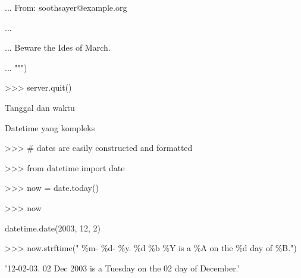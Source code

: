\noindent 
{\fontsize{14pt}{14pt}\selectfont ... From: soothsayer@example.org \\} \par
\noindent 
{\fontsize{14pt}{14pt}\selectfont ... \\} \par
\noindent 
{\fontsize{14pt}{14pt}\selectfont ... Beware the Ides of March. \\} \par
\noindent 
{\fontsize{14pt}{14pt}\selectfont ... """) \\} \par
\noindent 
{\fontsize{14pt}{14pt}\selectfont >>> server.quit() \\} \par
\vspace{14pt}
\noindent 
{\fontsize{14pt}{14pt}\selectfont Tanggal dan waktu \\} \par
\noindent 
{\fontsize{14pt}{14pt}\selectfont Datetime yang kompleks \\} \par
\vspace{14pt}
\noindent 
{\fontsize{14pt}{14pt}\selectfont >>>  $  \#  $ dates are easily constructed and formatted \\} \par
\vspace{14pt}
\noindent 
{\fontsize{14pt}{14pt}\selectfont >>> from datetime import date \\} \par
\noindent 
{\fontsize{14pt}{14pt}\selectfont >>> now = date.today() \\} \par
\vspace{14pt}
\noindent 
{\fontsize{14pt}{14pt}\selectfont >>> now \\} \par
\noindent 
{\fontsize{14pt}{14pt}\selectfont datetime.date(2003, 12, 2) \\} \par
\vspace{14pt}
\noindent 
{\fontsize{14pt}{14pt}\selectfont >>> now.strftime(" $  \%  $m- $  \%  $d- $  \%  $y.  $  \%  $d  $  \%  $b  $  \%  $Y is a  $  \%  $A on the  $  \%  $d day of  $  \%  $B.") \\} \par
\noindent 
{\fontsize{14pt}{14pt}\selectfont '12-02-03. 02 Dec 2003 is a Tuesday on the 02 day of December.' \\} \par
